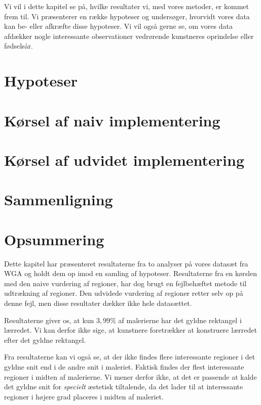 {
{\sffamily Vi vil i dette kapitel se på, hvilke resultater vi, med vores
metoder, er kommet frem til. Vi præsenterer en række hypoteser og
undersøger, hvorvidt vores data kan be- eller afkræfte disse hypoteser.
Vi vil også gerne se, om vores data afdækker nogle interessante
observationer vedrørende kunstneres oprindelse eller fødselsår.
}

\section{Hypoteser}


\section{Kørsel af naiv implementering\label{section_naiv_koersel}}


\section{Kørsel af udvidet implementering\label{section_udvidet_koersel}}


\section{Sammenligning\label{section_samlede_resultater}}


\section*{Opsummering}
Dette kapitel har præsenteret resultaterne fra to analyser på vores
datasæt fra WGA og holdt dem op imod en samling af hypoteser.
Resultaterne fra en kørslen med den naive vurdering af regioner, har dog
brugt en fejlbehæftet metode til udtrækning af regioner.  Den udvidede
vurdering af regioner retter selv op på denne fejl, men disse resultater
dækker ikke hele datasættet.

Resultaterne giver os, at kun $3,99 \%$ af malerierne har det
gyldne rektangel i lærredet. Vi kan derfor ikke sige, at kunstnere
foretrækker at konstruere lærredet efter det gyldne rektangel.

Fra resultaterne kan vi også se, at der ikke findes flere interessante
regioner i det gyldne snit end i de andre snit i maleriet. Faktisk
findes der flest interessante regioner i midten af malerierne. Vi mener
derfor ikke, at det er passende at kalde det gyldne snit for
\emph{specielt} æstetisk tiltalende, da det lader til at interessante
regioner i højere grad placeres i midten af maleriet.

}
